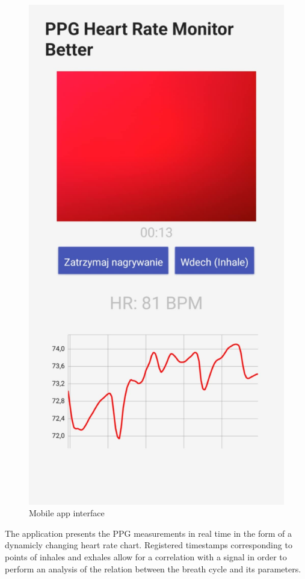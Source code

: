 \documentclass[journal]{IEEEtran}
\begin{document}
{\begin{figure}[htbp]
    \centering
    \includegraphics[scale=0.17]{aplikacja.png}
    \caption{Mobile app interface}
    \label{fig:aplikacja_mobilna}
\end{figure}


The application presents the PPG measurements in real time in the form of a dynamicly changing heart rate chart. Registered timestamps corresponding to points of inhales and exhales allow for a correlation with a signal in order to perform an analysis of the relation between the breath cycle and its parameters.


}
\end{document}
